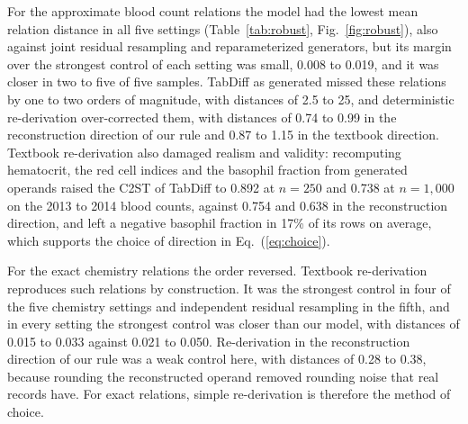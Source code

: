 \documentclass[conference]{IEEEtran}
\begin{document}
For the approximate blood count relations the model had the lowest mean relation distance in all five settings (Table~\ref{tab:robust}, Fig.~\ref{fig:robust}), also against joint residual resampling and reparameterized generators, but its margin over the strongest control of each setting was small, 0.008 to 0.019, and it was closer in two to five of five samples. TabDiff as generated missed these relations by one to two orders of magnitude, with distances of 2.5 to 25, and deterministic re-derivation over-corrected them, with distances of 0.74 to 0.99 in the reconstruction direction of our rule and 0.87 to 1.15 in the textbook direction. Textbook re-derivation also damaged realism and validity: recomputing hematocrit, the red cell indices and the basophil fraction from generated operands raised the C2ST of TabDiff to 0.892 at $n = 250$ and 0.738 at $n = 1{,}000$ on the 2013 to 2014 blood counts, against 0.754 and 0.638 in the reconstruction direction, and left a negative basophil fraction in 17\% of its rows on average, which supports the choice of direction in Eq.~(\ref{eq:choice}).

For the exact chemistry relations the order reversed. Textbook re-derivation reproduces such relations by construction. It was the strongest control in four of the five chemistry settings and independent residual resampling in the fifth, and in every setting the strongest control was closer than our model, with distances of 0.015 to 0.033 against 0.021 to 0.050. Re-derivation in the reconstruction direction of our rule was a weak control here, with distances of 0.28 to 0.38, because rounding the reconstructed operand removed rounding noise that real records have. For exact relations, simple re-derivation is therefore the method of choice.
\end{document}
